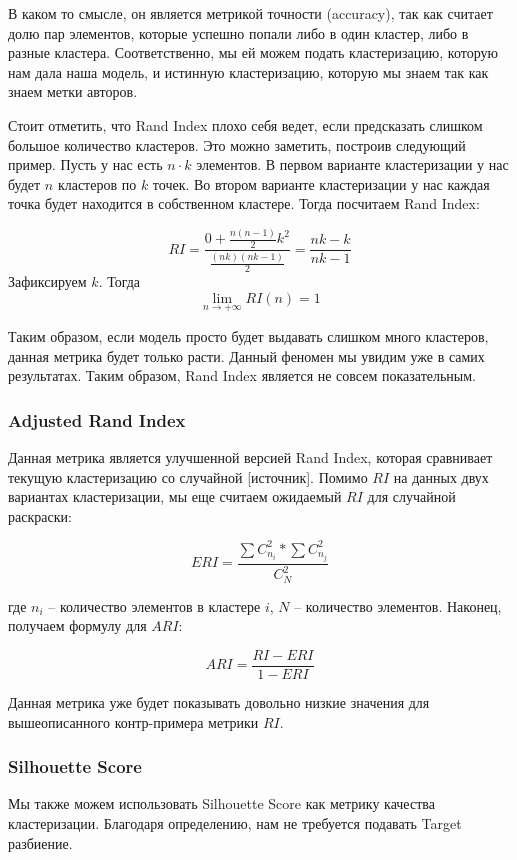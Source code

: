 В каком то смысле, он является метрикой точности (accuracy), так как считает долю пар элементов, которые успешно попали либо в один кластер, либо в разные кластера. Соответственно, мы ей можем подать кластеризацию, которую нам дала наша модель, и истинную кластеризацию, которую мы знаем так как знаем метки авторов.

Стоит отметить, что Rand Index плохо себя ведет, если предсказать слишком большое количество кластеров. Это можно заметить, построив следующий пример. Пусть у нас есть $n \cdot k$ элементов. В первом варианте кластеризации у нас будет $n$ кластеров по $k$ точек. Во втором варианте кластеризации у нас каждая точка будет находится в собственном кластере. Тогда посчитаем Rand Index:

$$
RI = \frac{0 + \frac{n(n-1)}{2}k^2}{\frac{(nk)(nk - 1)}{2}} = \frac{nk - k}{nk - 1}
$$
\noindent
Зафиксируем $k$. Тогда $$\lim_{n \rightarrow +\infty} RI(n) = 1$$

Таким образом, если модель просто будет выдавать слишком много кластеров, данная метрика будет только расти. Данный феномен мы увидим уже в самих результатах. Таким образом, Rand Index является не совсем показательным.

\subsubsection{Adjusted Rand Index}

Данная метрика является улучшенной версией Rand Index, которая сравнивает текущую кластеризацию со случайной [источник]. Помимо $RI$ на данных двух вариантах кластеризации, мы еще считаем ожидаемый $RI$ для случайной раскраски:

$$
ERI = \frac{\sum C_{n_i}^2 * \sum C_{n_j}^2}{C_N^2}
$$

\noindent где $n_i$ -- количество элементов в кластере $i$, $N$ -- количество элементов. Наконец, получаем формулу для $ARI$:

$$
ARI = \frac{RI - ERI}{1 - ERI}
$$

Данная метрика уже будет показывать довольно низкие значения для вышеописанного контр-примера метрики $RI$. 

\subsubsection{Silhouette Score}

Мы также можем использовать Silhouette Score как метрику качества кластеризации. Благодаря определению, нам не требуется подавать Target разбиение.

